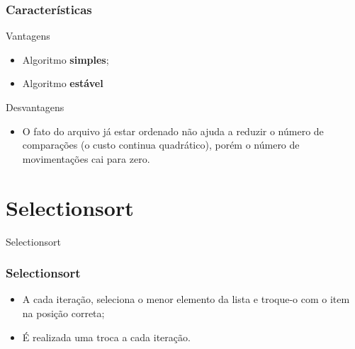 \documentclass[aspectratio=169]{beamer}
\begin{document}

\begin{frame}
\frametitle{Características}
\begin{block}{Vantagens}
  \begin{itemize}
  \item Algoritmo {\bf simples};
  \item Algoritmo {\bf estável}
  \end{itemize}
\end{block}
\begin{block}{Desvantagens}
  \begin{itemize}
  \item O fato do arquivo já estar ordenado não ajuda a reduzir o número de comparações (o custo continua quadrático), porém o número de movimentações cai para zero.
  \end{itemize} 
\end{block}
\end{frame}

\section{Selectionsort}

\begin{frame}
\Huge{\centerline{Selectionsort}}
\end{frame}



\begin{frame}
\frametitle{Selectionsort}
\begin{itemize}
\item A cada iteração, seleciona o menor elemento da lista e troque-o com o item na posição correta;
\item É realizada uma troca a cada iteração.
\end{itemize}
\end{frame}

\end{document}
